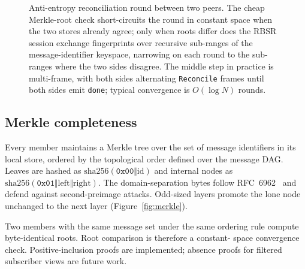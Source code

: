 \documentclass[11pt,a4paper,twocolumn]{article}
\begin{document}
\begin{figure}[t]
\caption{Anti-entropy reconciliation round between two peers. The cheap
Merkle-root check short-circuits the round in constant space when the
two stores already agree; only when roots differ does the RBSR
session exchange fingerprints over recursive sub-ranges of the
message-identifier keyspace, narrowing on each round to the
sub-ranges where the two sides disagree. The middle step in practice
is multi-frame, with both sides alternating \texttt{Reconcile} frames
until both sides emit \texttt{done}; typical convergence is
$O(\log N)$ rounds.}
\label{fig:antientropy}
\end{figure}

\subsection{Merkle completeness}
\label{sec:merkle}

Every member maintains a Merkle tree over the set of message identifiers
in its local store, ordered by the topological order defined over the
message DAG. Leaves are hashed as
$\mathrm{sha256}(\mathtt{0x00} \Vert \text{id})$ and internal nodes as
$\mathrm{sha256}(\mathtt{0x01} \Vert \text{left} \Vert \text{right})$.
The domain-separation bytes follow RFC~6962~\citep{laurie2013ct} and
defend against second-preimage attacks. Odd-sized layers promote the
lone node unchanged to the next layer (Figure~\ref{fig:merkle}).

Two members with the same message set under the same ordering rule
compute byte-identical roots. Root comparison is therefore a constant-
space convergence check. Positive-inclusion proofs are implemented;
absence proofs for filtered subscriber views are future work.
\end{document}
